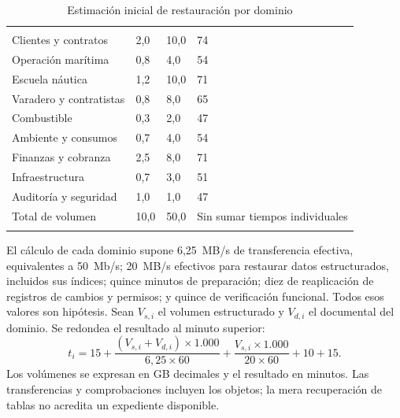 \begingroup
\setlength{\tabcolsep}{3pt}
\begin{longtable}{@{}L{.39\textwidth}L{.20\textwidth}L{.20\textwidth}L{\dimexpr.21\textwidth-18pt\relax}@{}}
\caption{Estimación inicial de restauración por dominio}\label{tab:sd5_restauracion_dominios}\\
\hline
{} &  &  &  \\ \hline
\endfirsthead
\hline
{} &  &  &  \\ \hline
\endhead
Clientes y contratos & 2,0 & 10,0 & 74 \\ \addlinespace \hline
Operación marítima & 0,8 & 4,0 & 54 \\ \addlinespace \hline
Escuela náutica & 1,2 & 10,0 & 71 \\ \addlinespace \hline
Varadero y contratistas & 0,8 & 8,0 & 65 \\ \addlinespace \hline
Combustible & 0,3 & 2,0 & 47 \\ \addlinespace \hline
Ambiente y consumos & 0,7 & 4,0 & 54 \\ \addlinespace \hline
Finanzas y cobranza & 2,5 & 8,0 & 71 \\ \addlinespace \hline
Infraestructura & 0,7 & 3,0 & 51 \\ \addlinespace \hline
Auditoría y seguridad & 1,0 & 1,0 & 47 \\ \addlinespace \hline
Total de volumen & 10,0 & 50,0 & Sin sumar tiempos individuales \\ \addlinespace \hline
\end{longtable}
\endgroup

El cálculo de cada dominio supone 6,25~MB/s de transferencia efectiva, equivalentes a 50~Mb/s; 20~MB/s efectivos para restaurar datos estructurados, incluidos sus índices; quince minutos de preparación; diez de reaplicación de registros de cambios y permisos; y quince de verificación funcional. Todos esos valores son hipótesis. Sean \(V_{s,i}\) el volumen estructurado y \(V_{d,i}\) el documental del dominio. Se redondea el resultado al minuto superior:
\[
t_i=15+
\frac{(V_{s,i}+V_{d,i})\times1.000}{6{,}25\times60}
+\frac{V_{s,i}\times1.000}{20\times60}
+10+15.
\]
Los volúmenes se expresan en GB decimales y el resultado en minutos. Las transferencias y comprobaciones incluyen los objetos; la mera recuperación de tablas no acredita un expediente disponible.

